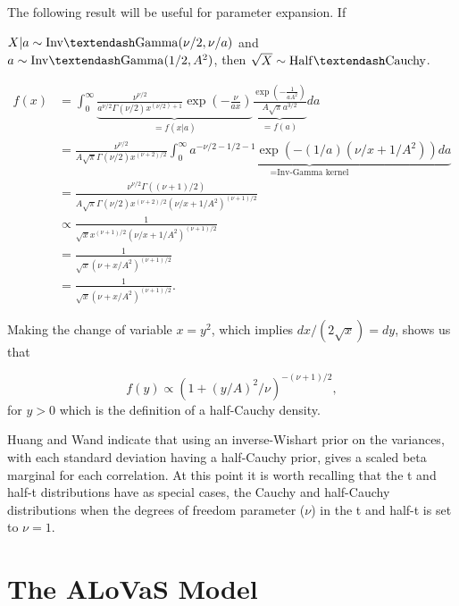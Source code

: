 The following result will be useful for parameter expansion. If 

$X\vert a \sim \mathrm{Inv\textendash Gamma}(\nu/2, \nu/a)$ and  $a \sim \mathrm{Inv\textendash Gamma}(1/2,A^2)$, then $\sqrt{X}\sim \mathrm{Half\textendash Cauchy}$. 

\begin{align*}
f(x) &= \int_0^\infty \underbrace{  \frac{\nu^{\nu/2}}{a^{\nu/2}\Gamma(\nu/2)x^{(\nu/2)+1}}\exp{(-\frac{\nu}{ax})}   }_{=f(x\vert a)} \underbrace{\frac{\exp{(-\frac{1}{aA^2})}}{A\sqrt{\pi}a^{3/2}}}_{=f(a)} da\\
&=\frac{\nu^{\nu/2}}{A\sqrt{\pi}\Gamma(\nu/2)x^{(\nu+2)/2}}\underbrace{\int_0^\infty a^{-\nu/2-1/2-1}\exp{(-(1/a)(\nu/x+1/A^2))}da}_{=\text{Inv-Gamma kernel}}\\
&=\frac{\nu^{\nu/2}\Gamma((\nu+1)/2)}{A\sqrt{\pi}\Gamma(\nu/2)x^{(\nu+2)/2}(\nu/x+1/A^2)^{(\nu+1)/2}}\\
&\propto \frac{1}{\sqrt{x}x^{(\nu+1)/2}(\nu/x+1/A^2)^{(\nu+1)/2}}\\
& =\frac{1}{\sqrt{x}(\nu+x/A^2)^{(\nu+1)/2}  }\\
&=\frac{1}{\sqrt{x}(\nu+x/A^2)^{(\nu+1)/2}  }.
\end{align*}

Making the change of variable $x=y^2$, which implies $dx/(2\sqrt{x})=dy$, shows us that 

\begin{equation}
f(y) \propto (1+(y/A)^2/\nu)^{-(\nu+1)/2},
\end{equation}
for $y>0$ which is the definition of a half-Cauchy density. 

Huang and Wand \cite{huang2013simple} indicate that using an inverse-Wishart prior on the variances, with each standard deviation having a half-Cauchy prior, gives a scaled beta marginal for each correlation. At this point it is worth recalling that the t and half-t distributions have as special cases, the Cauchy and half-Cauchy distributions when the degrees of freedom parameter ($\nu$) in the t and half-t is set to $\nu=1$. 



\section{The ALoVaS Model}\label{sec:Introduction}
	
